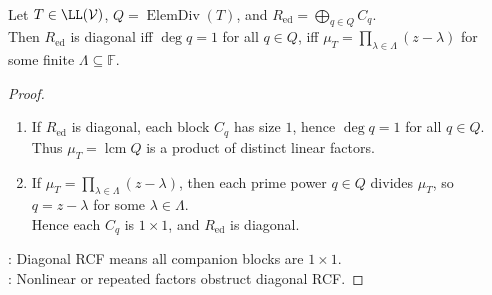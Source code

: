 \begin{corollary} \label{cor:diagonal-rational-canonical-form-criterion} \\
Let $T\in\LL(\mathcal{V})$, $Q=\operatorname{ElemDiv}(T)$, and $R_{\operatorname{ed}}=\bigoplus_{q\in Q}C_q$.\\
Then $R_{\operatorname{ed}}$ is diagonal iff $\deg q=1$ for all $q\in Q$, iff $\mu_T=\prod_{\lambda\in\Lambda}(z-\lambda)$ for some finite $\Lambda\subseteq\mathbb{F}$.
\begin{proof}
\begin{enumerate}[label=\roman*.]
\setlength{\itemsep}{0pt}
\item[$(\Rightarrow)$] If $R_{\operatorname{ed}}$ is diagonal, each block $C_q$ has size $1$, hence $\deg q=1$ for all $q\in Q$.\\
Thus $\mu_T=\operatorname{lcm}Q$ is a product of distinct linear factors.
\item[$(\Leftarrow)$] If $\mu_T=\prod_{\lambda\in\Lambda}(z-\lambda)$, then each prime power $q\in Q$ divides $\mu_T$, so $q=z-\lambda$ for some $\lambda\in\Lambda$.\\
Hence each $C_q$ is $1\times1$, and $R_{\operatorname{ed}}$ is diagonal.
\end{enumerate}
: Diagonal RCF means all companion blocks are $1\times1$.\\
: Nonlinear or repeated factors obstruct diagonal RCF.
\end{proof}
\end{corollary}

